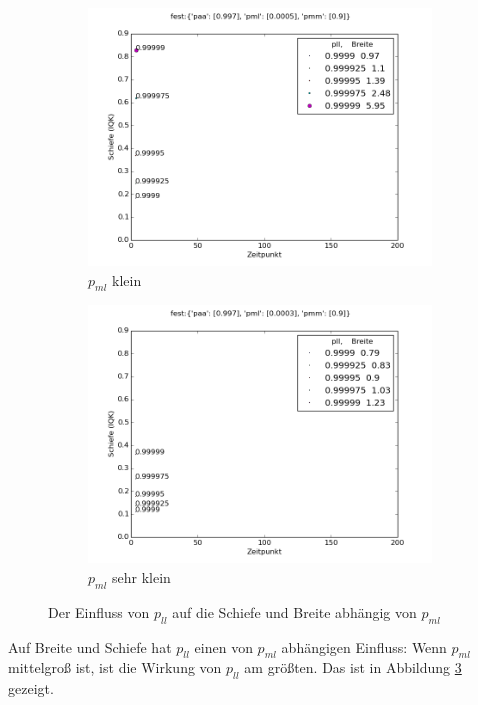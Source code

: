\begin{figure}
\begin{subfigure}[b]{0.5\textwidth}
\includegraphics[width=\textwidth]{bilder/pll/3fest_09_00005_0997_p}
\caption{$p_{ml}$ klein}
\label{einfluss_pll_pml-}
\end{subfigure}
\begin{subfigure}[b]{0.5\textwidth}
\includegraphics[width=\textwidth]{bilder/pll/3fest_09_00003_0997_p}
\caption{$p_{ml}$ sehr klein}
\label{einfluss_pll_pml--}
\end{subfigure}
\caption{Der Einfluss von $p_{ll}$ auf die Schiefe und Breite abhängig von $p_{ml}$}
\label{einfluss_pll_pml}
\end{figure}

Auf Breite und Schiefe hat $p_{ll}$ einen von $p_{ml}$ abhängigen Einfluss: Wenn $p_{ml}$ mittelgroß ist, ist die Wirkung von $p_{ll}$ am größten. Das ist in Abbildung \ref{einfluss_pll_pml} gezeigt.

